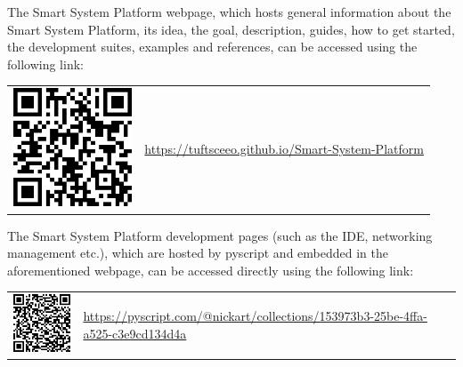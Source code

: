 The Smart System Platform webpage, which hosts general information about the Smart System Platform, its idea, the goal, description, guides, how to get started, the development suites, examples and references, can be accessed using the following link:
\vspace{25pt}
\begin{center}
\begin{tabular}{>{\centering\arraybackslash} m{175pt} m{300pt}}
 \includegraphics[width=100pt]{images/website-QRcode.png} & 
 \url{https://tuftsceeo.github.io/Smart-System-Platform}\\
\end{tabular}
\end{center}
\vspace{25pt}

The Smart System Platform development pages (such as the IDE, networking management etc.), which are hosted by pyscript and embedded in the aforementioned webpage, can be accessed directly using the following link:
\vspace{25pt}
\begin{center}
\begin{tabular}{>{\centering\arraybackslash} m{175pt} m{300pt}}
 \includegraphics[width=100pt]{images/pyscript-QRcode.png} & 
 \url{https://pyscript.com/@nickart/collections/153973b3-25be-4ffa-a525-c3e9cd134d4a}\\
\end{tabular}
\end{center}




